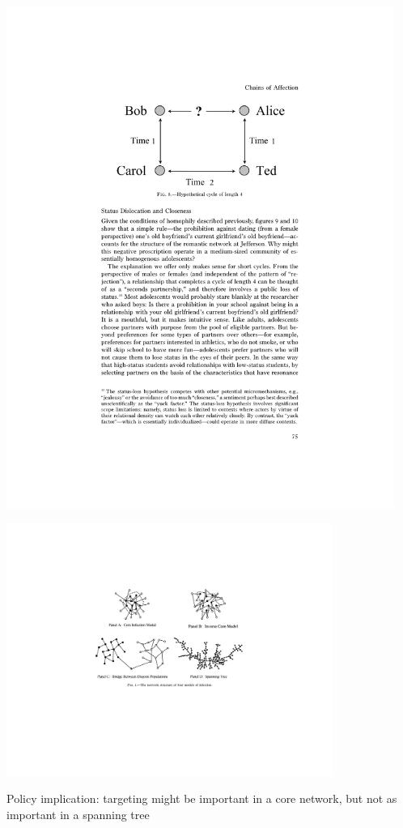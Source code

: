 \documentclass[aspectratio=169]{beamer}
\begin{document}
\begin{frame}

\begin{center}
\includegraphics[width = 0.95\textwidth]{figures/bearman_chains_2004_fig8}
\end{center}


\end{frame}
\begin{frame}

\begin{center}
\includegraphics[width = 0.80\textwidth]{figures/bearman_chains_2004_fig1}
\end{center}

Policy implication: targeting might be important in a core network, but not as important in a spanning tree

\end{frame}
\end{document}
